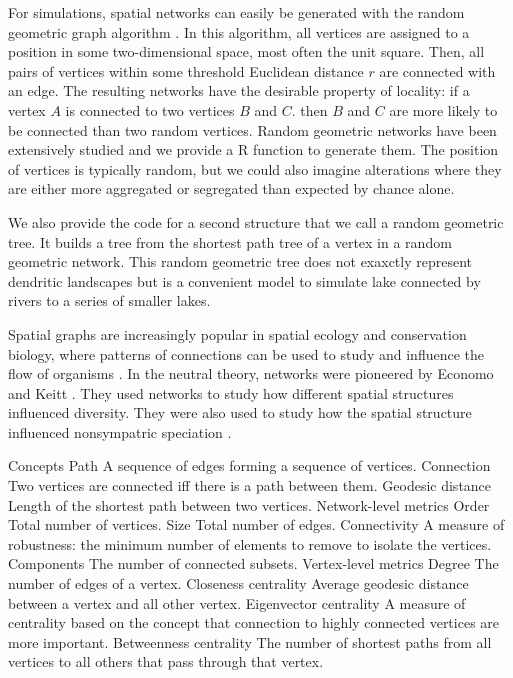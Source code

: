 \documentclass[12pt]{article}
\begin{document}
For simulations, spatial networks can easily be generated with the random
geometric graph algorithm \cite{sed01}. In this algorithm, all vertices are
assigned to a position in some two-dimensional space, most often the unit
square. Then, all pairs of vertices within some threshold Euclidean distance $r$
are connected with an edge. The resulting networks have the desirable
property of locality: if a vertex $A$ is connected to two vertices $B$ and $C$.
then $B$ and $C$ are more likely to be connected than two random vertices.
Random geometric networks have been extensively studied \cite{app97a,app97
b,app02a,app02b,pen03} and we provide a R function to generate them. The 
position of vertices is typically random, but we could also imagine alterations
where they are either more aggregated or segregated than expected by chance alone. 

We also provide the code for a second structure that we call a random geometric
tree.  It builds a tree from the shortest path tree \cite{dij59} of a vertex in
a random geometric network. This random geometric tree does not exaxctly
represent dendritic landscapes but is a convenient model to simulate lake
connected by rivers to a series of smaller lakes.

Spatial graphs are increasingly popular in spatial ecology and conservation
biology, where patterns of connections can be used to study and influence the
flow of organisms \cite{min07,fal07,min08,gar08,urb09,dal10}. In the neutral
theory, networks were pioneered by Economo and Keitt \cite{eco08, eco10}.  They
used networks to study how different spatial structures influenced diversity.
They were also used to study how the spatial structure influenced nonsympatric
speciation \cite{des12,des12b}.


Concepts
Path A sequence of edges forming a sequence of vertices.
Connection Two vertices are connected iff there is a path between them.
Geodesic distance Length of the shortest path between two vertices.
Network-level metrics
Order Total number of vertices.
Size Total number of edges.
Connectivity A measure of robustness: the minimum number of elements to remove
to isolate the vertices.
Components The number of connected subsets.
Vertex-level metrics
Degree The number of edges of a vertex.
Closeness centrality Average geodesic distance between a vertex and all other vertex.
Eigenvector centrality A measure of centrality based on the concept that connection to
highly connected vertices are more important.
Betweenness centrality The number of shortest paths from all vertices to all others that
pass through that vertex.
\end{document}
